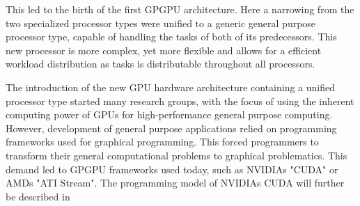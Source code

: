This led to the birth of the first GPGPU architecture. 
Here a narrowing from the two specialized processor types were unified to a generic general purpose processor type, capable of handling the tasks of both of its predecessors.
This new processor is more complex, yet more flexible and allows for a efficient workload distribution as tasks is distributable throughout all processors.

The introduction of the new GPU hardware architecture containing a unified processor type started many research groups, with the focus of using the inherent computing power of GPUs for high-performance general purpose computing.
However, development of general purpose applications relied on programming frameworks used for graphical programming.
This forced programmers to transform their general computational problems to graphical problematics.
This demand led to GPGPU frameworks used today, such as NVIDIAs "CUDA" or AMDs "ATI Stream".
The programming model of NVIDIAs CUDA will further be described in %


